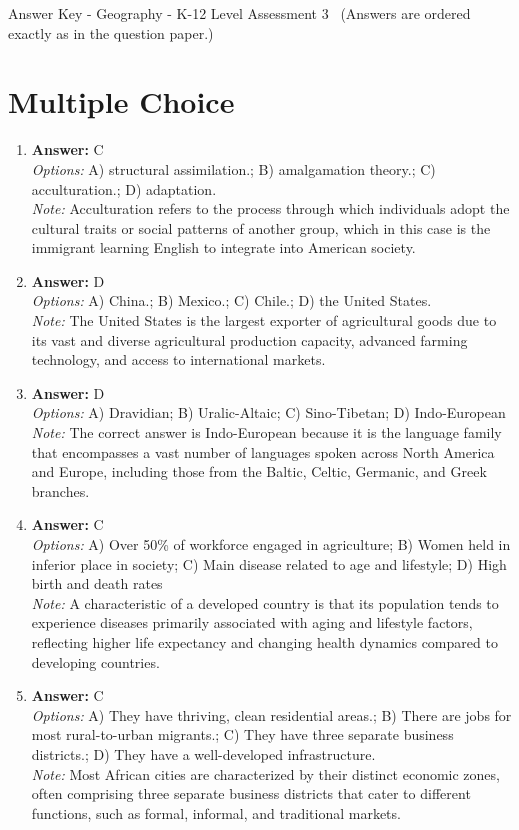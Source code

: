 \documentclass[12pt]{article}
\begin{document}
\begin{center}
Answer Key - Geography - K-12 Level Assessment 3 \
\small (Answers are ordered exactly as in the question paper.)
\end{center}

\section*{Multiple Choice}
\begin{enumerate}[label=\arabic*.]
\item \textbf{Answer:} C
\\ \textit{Options:} A) structural assimilation.; B) amalgamation theory.; C) acculturation.; D) adaptation.
\\ \textit{Note:} Acculturation refers to the process through which individuals adopt the cultural traits or social patterns of another group, which in this case is the immigrant learning English to integrate into American society.
\item \textbf{Answer:} D
\\ \textit{Options:} A) China.; B) Mexico.; C) Chile.; D) the United States.
\\ \textit{Note:} The United States is the largest exporter of agricultural goods due to its vast and diverse agricultural production capacity, advanced farming technology, and access to international markets.
\item \textbf{Answer:} D
\\ \textit{Options:} A) Dravidian; B) Uralic-Altaic; C) Sino-Tibetan; D) Indo-European
\\ \textit{Note:} The correct answer is Indo-European because it is the language family that encompasses a vast number of languages spoken across North America and Europe, including those from the Baltic, Celtic, Germanic, and Greek branches.
\item \textbf{Answer:} C
\\ \textit{Options:} A) Over 50\% of workforce engaged in agriculture; B) Women held in inferior place in society; C) Main disease related to age and lifestyle; D) High birth and death rates
\\ \textit{Note:} A characteristic of a developed country is that its population tends to experience diseases primarily associated with aging and lifestyle factors, reflecting higher life expectancy and changing health dynamics compared to developing countries.
\item \textbf{Answer:} C
\\ \textit{Options:} A) They have thriving, clean residential areas.; B) There are jobs for most rural-to-urban migrants.; C) They have three separate business districts.; D) They have a well-developed infrastructure.
\\ \textit{Note:} Most African cities are characterized by their distinct economic zones, often comprising three separate business districts that cater to different functions, such as formal, informal, and traditional markets.
\end{enumerate}
\end{document}
